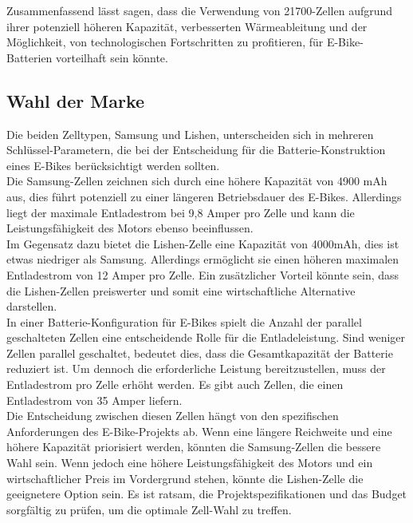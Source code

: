 Zusammenfassend lässt sagen, dass die Verwendung von 21700-Zellen aufgrund ihrer potenziell höheren Kapazität, verbesserten Wärmeableitung und der Möglichkeit, von technologischen Fortschritten zu profitieren, für E-Bike-Batterien vorteilhaft sein könnte.







\subsection{Wahl der Marke}
Die beiden Zelltypen, Samsung und Lishen, unterscheiden sich in mehreren Schlüssel-Parametern, die bei der Entscheidung für die Batterie-Konstruktion eines E-Bikes berücksichtigt werden sollten.\\
Die Samsung-Zellen zeichnen sich durch eine höhere Kapazität von 4900 mAh aus, dies führt potenziell zu einer längeren Betriebsdauer des E-Bikes.
Allerdings liegt der maximale Entladestrom bei 9,8 Amper pro Zelle und kann die Leistungsfähigkeit des Motors ebenso beeinflussen.\\

Im Gegensatz dazu bietet die Lishen-Zelle eine Kapazität von 4000mAh, dies ist etwas niedriger als Samsung.
Allerdings ermöglicht sie einen höheren maximalen Entladestrom von 12 Amper pro Zelle.
Ein zusätzlicher Vorteil könnte sein, dass die Lishen-Zellen preiswerter und somit eine wirtschaftliche Alternative darstellen.\\

In einer Batterie-Konfiguration für E-Bikes spielt die Anzahl der parallel geschalteten Zellen eine entscheidende Rolle für die Entladeleistung.
Sind weniger Zellen parallel geschaltet, bedeutet dies, dass die Gesamtkapazität der Batterie reduziert ist.
Um dennoch die erforderliche Leistung bereitzustellen, muss der Entladestrom pro Zelle erhöht werden.
Es gibt auch Zellen, die einen Entladestrom von 35 Amper liefern. \\

Die Entscheidung zwischen diesen Zellen hängt von den spezifischen Anforderungen des E-Bike-Projekts ab.
Wenn eine längere Reichweite und eine höhere Kapazität priorisiert werden, könnten die Samsung-Zellen die bessere Wahl sein.
Wenn jedoch eine höhere Leistungsfähigkeit des Motors und ein wirtschaftlicher Preis im Vordergrund stehen, könnte die Lishen-Zelle die geeignetere Option sein.
Es ist ratsam, die Projektspezifikationen und das Budget sorgfältig zu prüfen, um die optimale Zell-Wahl zu treffen.\\

